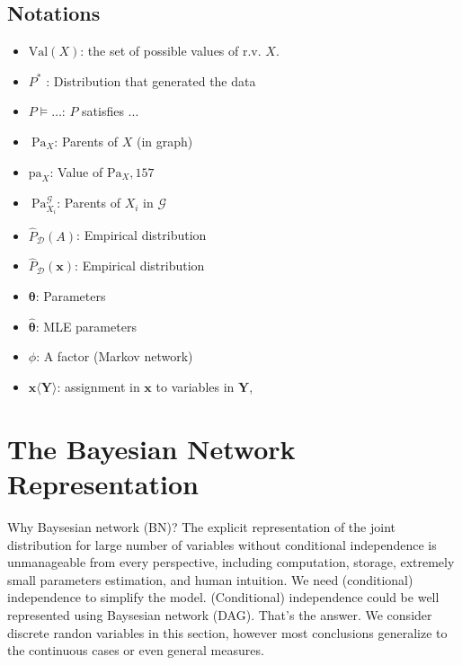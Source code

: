 \documentclass{article}
\begin{document}
\subsection{Notations}
\begin{itemize}
    \item $\mathrm{Val}(X)$: the set of possible values of r.v. $X$.
    \item $P^{*}$ : Distribution that generated the data
\item $P \models \ldots$: $P$ satisfies ...
\item $\mathrm{~Pa}_{X}$: Parents of $X$ (in graph)
\item $\mathrm{pa}_{X}$: Value of $\mathrm{Pa}_{X}, 157$
\item $\mathrm{~Pa}_{X_{i}}^{\mathcal{G}}$: Parents of $X_{i}$ in $\mathcal{G}$
\item $\hat{P}_{\mathcal{D}}(A)$: Empirical distribution
\item $\hat{P}_{\mathcal{D}}(\boldsymbol{x})$: Empirical distribution
\item $\boldsymbol{\theta}$: Parameters
\item $\hat{\boldsymbol{\theta}}$: MLE parameters
\item $\phi$: A factor (Markov network)
\item $\boldsymbol{x}\langle\boldsymbol{Y}\rangle$: assignment in $\boldsymbol{x}$ to variables in $\boldsymbol{Y}$,
\end{itemize}




\section{The Bayesian Network Representation}

Why Baysesian network (BN)? The explicit representation of the joint distribution for large number of variables without conditional independence is unmanageable from every perspective, including computation, storage, extremely small parameters estimation, and human intuition. We need (conditional) independence to simplify the model. (Conditional) independence could be well represented using Baysesian network (DAG). That's the answer. We consider discrete randon variables in this section, however most conclusions generalize to the continuous cases or even general measures.
\end{document}
